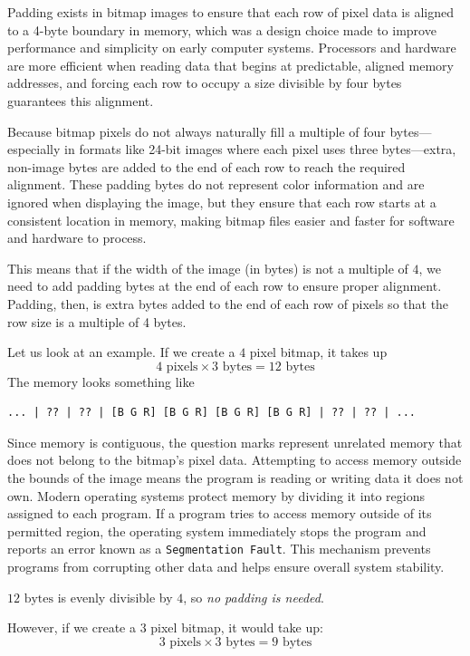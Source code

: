 Padding exists in bitmap images to ensure that each row of pixel data is aligned to a 4-byte boundary in memory, which was a design choice made to improve performance and simplicity on early computer systems. Processors and hardware are more efficient when reading data that begins at predictable, aligned memory addresses, and forcing each row to occupy a size divisible by four bytes guarantees this alignment.

Because bitmap pixels do not always naturally fill a multiple of four bytes—especially in formats like 24-bit images where each pixel uses three bytes—extra, non-image bytes are added to the end of each row to reach the required alignment. These padding bytes do not represent color information and are ignored when displaying the image, but they ensure that each row starts at a consistent location in memory, making bitmap files easier and faster for software and hardware to process.

This means that if the width of the image (in bytes) is not a multiple of $4$, we need to add padding bytes at the end of each row to ensure proper alignment. Padding, then, is extra bytes added to the end of each row of pixels so that the row size is a multiple of 4 bytes.

Let us look at an example. If we create a $4$ pixel bitmap, it takes up
$$4 \text{ pixels} \times 3 \text{ bytes} = 12 \text{ bytes}$$
The memory looks something like
\begin{verbatim}
... | ?? | ?? | [B G R] [B G R] [B G R] [B G R] | ?? | ?? | ...
\end{verbatim}

Since memory is contiguous, the question marks represent unrelated memory that does not belong to the bitmap's pixel data. Attempting to access memory outside the bounds of the image means the program is reading or writing data it does not own. Modern operating systems protect memory by dividing it into regions assigned to each program. If a program tries to access memory outside of its permitted region, the operating system immediately stops the program and reports an error known as a \texttt{Segmentation Fault}. This mechanism prevents programs from corrupting other data and helps ensure overall system stability.

$12 \text{ bytes}$ is evenly divisible by $4$, so \emph{no padding is needed}.

However, if we create a 3 pixel bitmap, it would take up:
$$3 \text{ pixels} \times 3 \text{ bytes} = 9 \text{ bytes}$$

